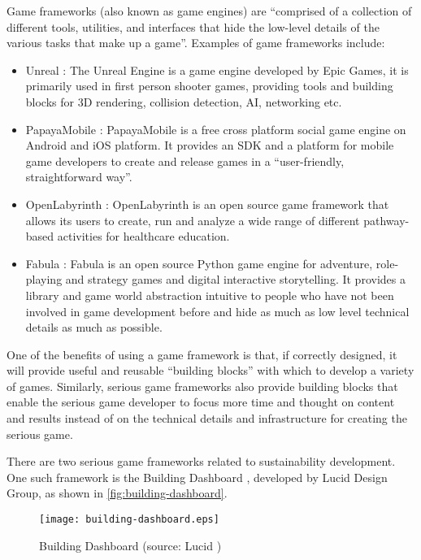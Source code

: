 Game frameworks (also known as game engines) \cite{sherrod2006ultimate} are ``comprised of a collection of different tools, utilities, and interfaces that hide the low-level details of the various tasks that make up a game''. Examples of game frameworks include:
\begin {itemize}
    \item Unreal \cite{unrealengine}:  The Unreal Engine is a game engine developed by Epic Games, it is primarily used in first person shooter games, providing tools and building blocks for 3D rendering, collision detection, AI, networking etc.
    \item PapayaMobile \cite{papayamobile}: PapayaMobile is a free cross platform social game engine on Android and iOS platform. It provides an SDK and a platform for mobile game developers to create and release games in a ``user-friendly, straightforward way''.
    \item OpenLabyrinth \cite{openlabyrinth}: OpenLabyrinth is an open source game framework that allows its users to create, run and analyze a wide range of different pathway-based activities for healthcare education.
    \item Fabula \cite{fabula}: Fabula is an open source Python game engine for adventure, role-playing and strategy games and digital interactive storytelling. It provides a library and game world abstraction intuitive to people who have not been involved in game development before and hide as much as low level technical details as much as possible.
\end {itemize}

One of the benefits of using a game framework is that, if correctly designed, it will provide useful and reusable ``building blocks'' with which to develop a variety of games. Similarly, serious game frameworks also provide building blocks that enable the serious game developer to focus more time and thought on content and results instead of on the technical details and infrastructure for creating the serious game.

There are two serious game frameworks related to sustainability development. One such framework is the Building Dashboard \cite{building-dashboard}, developed by Lucid Design Group, as shown in \autoref{fig:building-dashboard}.

\begin{figure}[ht!]
	\centering
		\texttt{[image: building-dashboard.eps]}
		\caption{Building Dashboard (source: Lucid \cite{building-dashboard})}
		\label{fig:building-dashboard}
\end{figure}

